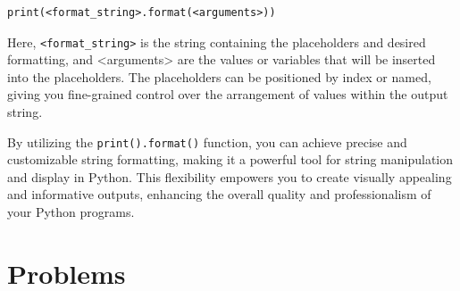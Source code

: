 \documentclass[12pt]{book}
\begin{document}
\begin{verbatim}
print(<format_string>.format(<arguments>))
\end{verbatim}

Here, \texttt{<format\_string>} is the string containing the placeholders and desired formatting, and <arguments> are the values or variables that will be inserted into the placeholders. The placeholders can be positioned by index or named, giving you fine-grained control over the arrangement of values within the output string.

By utilizing the \texttt{print().format()} function, you can achieve precise and customizable string formatting, making it a powerful tool for string manipulation and display in Python. This flexibility empowers you to create visually appealing and informative outputs, enhancing the overall quality and professionalism of your Python programs.
\section{Problems}
\end{document}
